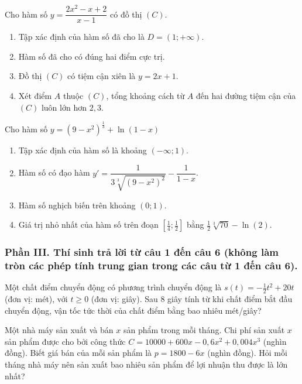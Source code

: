 \begin{baitap}
	Cho hàm số $y = \dfrac{2x^2 - x + 2}{x - 1}$ có đồ thị $(C)$.
	\begin{enumerate}
		\item Tập xác định của hàm số đã cho là $D = (1; +\infty)$.
		\item Hàm số đã cho có đúng hai điểm cực trị.
		\item Đồ thị $(C)$ có tiệm cận xiên là $y = 2x + 1$.
		\item Xét điểm $A$ thuộc $(C)$, tổng khoảng cách từ $A$ đến hai đường tiệm cận của $(C)$ luôn lớn hơn $2{,}3$.
	\end{enumerate}
\end{baitap}

\begin{baitap}
	Cho hàm số $y = \left(9 - x^2\right)^{\frac{1}{3}} + \ln(1 - x)$
	\begin{enumerate}
		\item Tập xác định của hàm số là khoảng $(-\infty; 1)$.
		\item Hàm số có đạo hàm $y' = \dfrac{1}{3\sqrt[3]{(9 - x^2)^2}} - \dfrac{1}{1 - x}$.
		\item Hàm số nghịch biến trên khoảng $(0; 1)$.
		\item Giá trị nhỏ nhất của hàm số trên đoạn $\left[\frac{1}{4}; \frac{1}{2}\right]$ bằng $\frac{1}{2}\sqrt[3]{70} - \ln(2)$.
	\end{enumerate}
\end{baitap}

\subsubsection*{Phần III. Thí sinh trả lời từ câu 1 đến câu 6 (không làm tròn các phép tính trung gian trong các câu từ 1 đến câu 6).}
\setcounter{bt}{0}
\begin{baitap}
	Một chất điểm chuyển động có phương trình chuyển động là $s(t) = -\frac{1}{2}t^2 + 20t$ (đơn vị: mét), với $t \ge 0$ (đơn vị: giây). Sau 8 giây tính từ khi chất điểm bắt đầu chuyển động, vận tốc tức thời của chất điểm bằng bao nhiêu mét/giây?
\end{baitap}
\begin{baitap}
	Một nhà máy sản xuất và bán $x$ sản phẩm trong mỗi tháng. Chi phí sản xuất $x$ sản phẩm được cho bởi công thức $C = 10000 + 600x - 0{,}6x^2 + 0{,}004x^3$ (nghìn đồng). Biết giá bán của mỗi sản phẩm là $p = 1800 - 6x$ (nghìn đồng). Hỏi mỗi tháng nhà máy nên sản xuất bao nhiêu sản phẩm để lợi nhuận thu được là lớn nhất?
\end{baitap}

